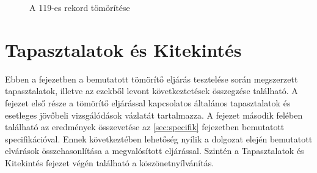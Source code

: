 \documentclass[oneside,titlepage,12pt,a4paper]{report}
\begin{document}
\begin{figure}[htb!]
\caption{A 119-es rekord tömörítése}
\end{figure}	


\chapter{Tapasztalatok és Kitekintés}

Ebben a fejezetben a bemutatott tömörítő eljárás tesztelése során megszerzett tapasztalatok, illetve az ezekből levont következtetések összegzése található. A fejezet első része a tömörítő eljárással kapcsolatos általános tapasztalatok és esetleges jövőbeli vizsgálódások vázlatát tartalmazza. A fejezet második felében található az eredmények összevetése az \ref{sec:specifik} fejezetben bemutatott specifikációval. Ennek következtében lehetőség nyílik a dolgozat elején bemutatott elvárások összehasonlítása a megvalósított eljárással. Szintén a Tapasztalatok és Kitekintés fejezet végén található a köszönetnyílvánítás.  
\end{document}
